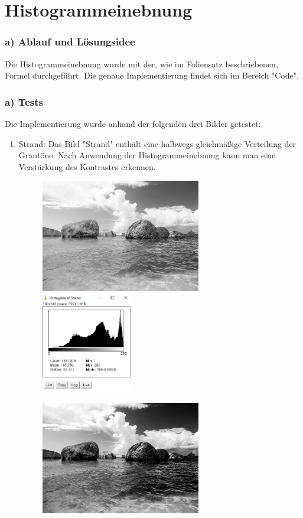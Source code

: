 \documentclass[12pt,german]{article}
\begin{document}
\section{Histogrammeinebnung  }

\subsubsection{a) Ablauf und Lösungsidee}
 Die Histogrammeinebnung wurde mit der, wie im Foliensatz beschriebenen, Formel durchgeführt. Die genaue Implementierung findet sich im Bereich "Code". 
\subsubsection{a) Tests}
Die Implementierung wurde anhand der folgenden drei Bilder getestet:
\begin{enumerate}
\item Strand: 
Das Bild "Strand" enthält eine halbwegs gleichmäßige Verteilung der Grautöne. Nach Anwendung der Histogrammeinebnung kann man eine Verstärkung des Kontrastes erkennen.
\begin{figure}[h!] \centering
	\includegraphics[width=7cm]{../testData/Results/Strand/Strand.jpg}
	\includegraphics[width=4cm]{../testData/Results/Strand/Strand-histogram.png}
\end{figure}
\begin{figure}[h!] \centering
	\includegraphics[width=7cm]{../testData/Results/Strand/Strand-equalized.jpg}

\end{figure}
\end{enumerate}
\end{document}
